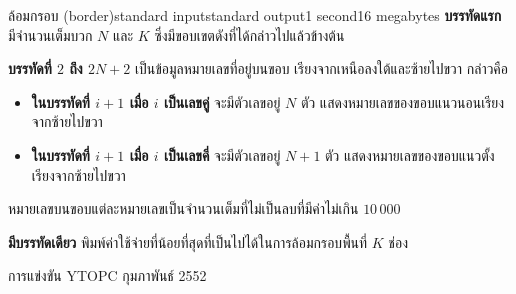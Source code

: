 \documentclass[11pt,a4paper]{article}
\begin{document}
\begin{problem}{ล้อมกรอบ (border)}{standard input}{standard output}{1 second}{16 megabytes}
\textbf{บรรทัดแรก} มีจำนวนเต็มบวก $N$ และ $K$ ซึ่งมีขอบเขตดังที่ได้กล่าวไปแล้วข้างต้น

\textbf{บรรทัดที่ $2$ ถึง $2N+2$} เป็นข้อมูลหมายเลขที่อยู่บนขอบ เรียงจากเหนือลงใต้และซ้ายไปขวา กล่าวคือ
\newpage

\begin{itemize}
   
\item \textbf{ในบรรทัดที่ $i+1$ เมื่อ $i$ เป็นเลขคู่} จะมีตัวเลขอยู่ $N$ ตัว แสดงหมายเลขของขอบแนวนอนเรียงจากซ้ายไปขวา
   
\item \textbf{ในบรรทัดที่ $i+1$ เมื่อ $i$ เป็นเลขคี่} จะมีตัวเลขอยู่ $N+1$ ตัว แสดงหมายเลขของขอบแนวตั้งเรียงจากซ้ายไปขวา
    \end{itemize}
หมายเลขบนขอบแต่ละหมายเลขเป็นจำนวนเต็มที่ไม่เป็นลบที่มีค่าไม่เกิน $10\,000$

\OutputFile

\textbf{มีบรรทัดเดียว} พิมพ์ค่าใช้จ่ายที่น้อยที่สุดที่เป็นไปได้ในการล้อมกรอบพื้นที่ $K$ ช่อง

\Examples

\begin{example}
%
\end{example}


\Source

การแข่งขัน YTOPC กุมภาพันธ์ 2552

\end{problem}
\end{document}
